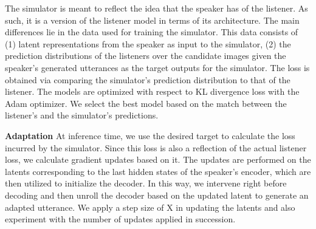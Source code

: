 The simulator is meant to reflect the idea that the speaker has of the listener. As such, it is a version of the listener model in terms of its architecture. %
The main differences lie in the data used for training the simulator. This data consists of (1) latent representations from the speaker as input to the simulator, (2) the prediction distributions of the listeners over the candidate images given the speaker's generated utterances as the target outputs for the simulator. The loss is obtained via comparing the simulator's prediction distribution to that of the listener. The models are optimized with respect to KL divergence loss with the Adam optimizer. We select the best model based on the match between the listener's and the simulator's predictions. 

\noindent\textbf{Adaptation} At inference time, we use the desired target to calculate the loss incurred by the simulator. Since this loss is also a reflection of the actual listener loss, we calculate gradient updates based on it. The updates are performed on the latents corresponding to the last hidden states of the speaker's encoder, which are then utilized to initialize the decoder. In this way, we intervene right before decoding and then unroll the decoder based on the updated latent to generate an adapted utterance. We apply a step size of X in updating the latents and also experiment with the number of updates applied in succession.

